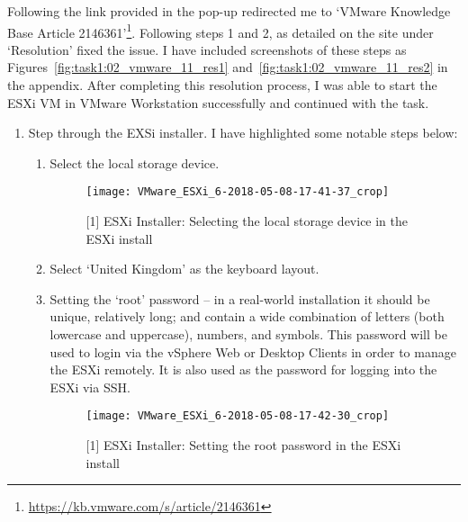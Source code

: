 \noindent Following the link provided in the pop-up redirected me to `VMware Knowledge Base Article 2146361'\footnote{\url{https://kb.vmware.com/s/article/2146361}}\citep{site:kbvmware:deviceguard:20171208}. Following steps 1 and 2, as detailed on the site under `Resolution' fixed the issue. I have included screenshots of these steps as Figures~\ref{fig:task1:02_vmware_11_res1} and~\ref{fig:task1:02_vmware_11_res2} in the  appendix. After completing this resolution process, I was able to start the ESXi VM in VMware Workstation successfully and continued with the task.

\begin{enumerate}[resume*=task1methodology]
  \item Step through the EXSi installer. I have highlighted some notable steps below:
    \begin{enumerate}[label=(\alph*)]
      \item Select the local storage device.
        \begin{figure}[H]
          \centering
          \captionsetup{skip=2pt}
          \texttt{[image: VMware\_ESXi\_6-2018-05-08-17-41-37\_crop]}
          \caption{[1] ESXi Installer: Selecting the local storage device in the ESXi install}
          \label{fig:task1:esxiinstall_01}
        \end{figure}
      \item Select `United Kingdom' as the keyboard layout.
      \item Setting the `root' password -- in a real-world installation it should be unique, relatively long; and contain a wide combination of letters (both lowercase and uppercase), numbers, and symbols. This password will be used to login via the vSphere Web or Desktop Clients in order to manage the ESXi remotely. It is also used as the password for logging into the ESXi via SSH.
        \begin{figure}[H]
          \centering
          \captionsetup{skip=2pt}
          \texttt{[image: VMware\_ESXi\_6-2018-05-08-17-42-30\_crop]}
          \caption{[1] ESXi Installer: Setting the root password in the ESXi install}

\end{figure}
\end{enumerate}
\end{enumerate}
